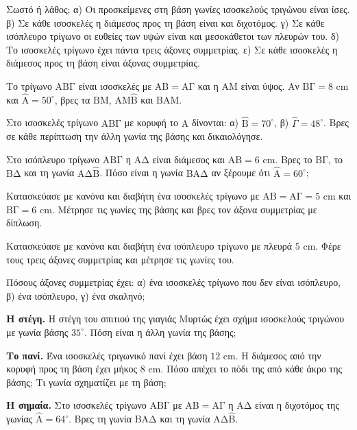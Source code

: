 

\ex Σωστό ή λάθος; α) Οι προσκείμενες στη βάση γωνίες ισοσκελούς τριγώνου είναι ίσες. \quad β) Σε κάθε ισοσκελές η διάμεσος προς τη βάση είναι και διχοτόμος. \quad γ) Σε κάθε ισόπλευρο τρίγωνο οι ευθείες των υψών είναι και μεσοκάθετοι των πλευρών του. \quad δ) Το ισοσκελές τρίγωνο έχει πάντα τρεις άξονες συμμετρίας. \quad ε) Σε κάθε ισοσκελές η διάμεσος προς τη βάση είναι άξονας συμμετρίας.

\ex Το τρίγωνο $\mathrm{ΑΒΓ}$ είναι ισοσκελές με $\mathrm{ΑΒ}=\mathrm{ΑΓ}$ και η $\mathrm{ΑΜ}$ είναι ύψος. Αν $\mathrm{ΒΓ}=8$ cm και $\hat{\mathrm{Α}}=50^\circ$, βρες τα $\mathrm{ΒΜ}$, $\mathrm{ΑΜ}\hat{\mathrm{Β}}$ και $\mathrm{ΒΑΜ}$.

\ex Στο ισοσκελές τρίγωνο $\mathrm{ΑΒΓ}$ με κορυφή το $\mathrm{Α}$ δίνονται: α) $\hat{\mathrm{Β}}=70^\circ$, β) $\hat{\Gamma}=48^\circ$. Βρες σε κάθε περίπτωση την άλλη γωνία της βάσης και δικαιολόγησε.

\ex Στο ισόπλευρο τρίγωνο $\mathrm{ΑΒΓ}$ η $\mathrm{ΑΔ}$ είναι διάμεσος και $\mathrm{ΑΒ}=6$ cm. Βρες το $\mathrm{ΒΓ}$, το $\mathrm{ΒΔ}$ και τη γωνία $\mathrm{ΑΔ}\hat{\mathrm{Β}}$. Πόσο είναι η γωνία $\mathrm{ΒΑΔ}$ αν ξέρουμε ότι $\hat{\mathrm{Α}}=60^\circ$;

\ex Κατασκεύασε με κανόνα και διαβήτη ένα ισοσκελές τρίγωνο με $\mathrm{ΑΒ}=\mathrm{ΑΓ}=5$ cm και $\mathrm{ΒΓ}=6$ cm. Μέτρησε τις γωνίες της βάσης και βρες τον άξονα συμμετρίας με δίπλωση.

\ex Κατασκεύασε με κανόνα και διαβήτη ένα ισόπλευρο τρίγωνο με πλευρά $5$ cm. Φέρε τους τρεις άξονες συμμετρίας και μέτρησε τις γωνίες του.

\ex Πόσους άξονες συμμετρίας έχει: α) ένα ισοσκελές τρίγωνο που δεν είναι ισόπλευρο, β) ένα ισόπλευρο, γ) ένα σκαληνό;


\ex \textbf{Η στέγη.} Η στέγη του σπιτιού της γιαγιάς Μυρτώς έχει σχήμα ισοσκελούς τριγώνου με γωνία βάσης $35^\circ$. Πόση είναι η άλλη γωνία της βάσης;

\ex \textbf{Το πανί.} Ένα ισοσκελές τριγωνικό πανί έχει βάση $12$ cm. Η διάμεσος από την κορυφή προς τη βάση έχει μήκος $8$ cm. Πόσο απέχει το πόδι της από κάθε άκρο της βάσης; Τι γωνία σχηματίζει με τη βάση;

\ex \textbf{Η σημαία.} Στο ισοσκελές τρίγωνο $\mathrm{ΑΒΓ}$ με $\mathrm{ΑΒ}=\mathrm{ΑΓ}$ η $\mathrm{ΑΔ}$ είναι η διχοτόμος της γωνίας $\hat{\mathrm{Α}}=64^\circ$. Βρες τη γωνία $\mathrm{ΒΑΔ}$ και τη γωνία $\mathrm{ΑΔ}\hat{\mathrm{Β}}$.

